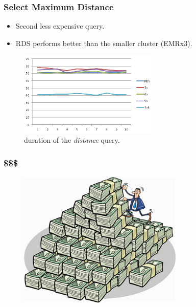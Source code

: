 \documentclass[hyperref={pdfpagelabels=true}]{beamer}
\begin{document}
\begin{frame}
\frametitle{Select Maximum Distance}
  \begin{itemize}    
    \item<2->Second less expensive query.
    \item<3->RDS performs better than the smaller cluster (EMRx3).
  \end{itemize} 
    \begin{figure}       
	\includegraphics[width=0.6\textwidth]{dist2.png}      
	\caption{\tiny{duration of the \textit{distance} query.}}
     \end{figure} 
\end{frame}

\begin{frame}
\frametitle{\$\$\$}
    \begin{figure}       
	\includegraphics[width=0.7\textwidth]{money.png}      
     \end{figure} 
\end{frame}
\end{document}

